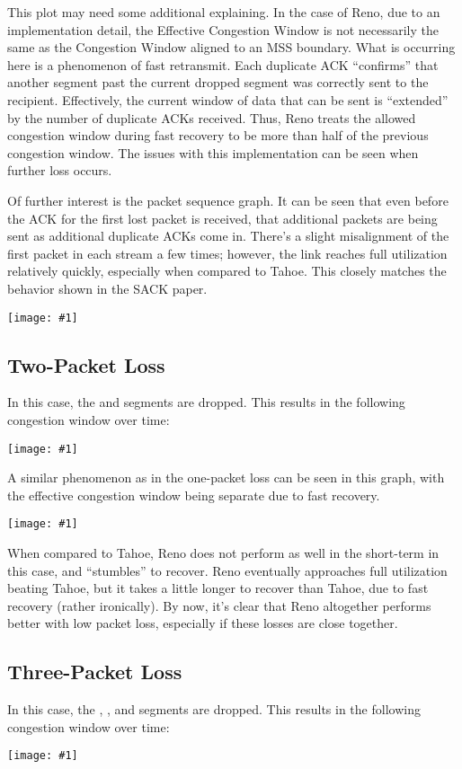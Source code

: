 \documentclass[fleqn,11pt]{article}
\newcommand{\graph}[2]{\begin{center}\texttt{[image: \#1]}\end{center}}
\newcommand{\cwnd}[1]{\graph{#1/cwnd}{height=3.5in}}
\newcommand{\sequence}[1]{\graph{#1/sequence}{}}
\begin{document}
This plot may need some additional explaining.
In the case of Reno, due to an implementation detail, the Effective Congestion Window is not necessarily the same as the Congestion Window aligned to an MSS boundary.
What is occurring here is a phenomenon of fast retransmit.
Each duplicate ACK ``confirms'' that another segment past the current dropped segment was correctly sent to the recipient.
Effectively, the current window of data that can be sent is ``extended'' by the number of duplicate ACKs received.
Thus, Reno treats the allowed congestion window during fast recovery to be more than half of the previous congestion window.
The issues with this implementation can be seen when further loss occurs.

Of further interest is the packet sequence graph.
It can be seen that even before the ACK for the first lost packet is received, that additional packets are being sent as additional duplicate ACKs come in.
There's a slight misalignment of the first packet in each stream a few times;
however, the link reaches full utilization relatively quickly, especially when compared to Tahoe.
This closely matches the behavior shown in the SACK paper.
\sequence{reno-1}

\subsection{Two-Packet Loss}
In this case, the  and  segments are dropped.
This results in the following congestion window over time:
\cwnd{reno-2}

A similar phenomenon as in the one-packet loss can be seen in this graph, with the effective congestion window being separate due to fast recovery.
\sequence{reno-2}

When compared to Tahoe, Reno does not perform as well in the short-term in this case, and ``stumbles'' to recover.
Reno eventually approaches full utilization beating Tahoe, but it takes a little longer to recover than Tahoe, due to fast recovery (rather ironically).
By now, it's clear that Reno altogether performs better with low packet loss, especially if these losses are close together.

\subsection{Three-Packet Loss}
In this case, the , , and  segments are dropped.
This results in the following congestion window over time:
\cwnd{reno-3}
\end{document}
